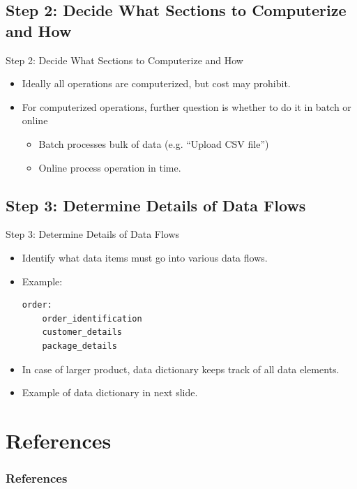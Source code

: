 \documentclass{beamer}
\begin{document}
	\subsection{Step 2: Decide What Sections to Computerize and How}
	\begin{frame}{Step 2: Decide What Sections to Computerize and How}
		\begin{itemize}
			\item Ideally all operations are computerized, but cost may prohibit.
			\item For computerized operations, further question is whether to do it in batch or online
			\begin{itemize}
				\item Batch processes bulk of data (e.g. ``Upload CSV file'')
				\item Online process operation in time.
			\end{itemize}
		\end{itemize}
	\end{frame}

	\subsection{Step 3: Determine Details of Data Flows}
	\begin{frame}[fragile]{Step 3: Determine Details of Data Flows}
		\begin{itemize}
			\item Identify what data items must go into various data flows.
			\item Example:
\begin{verbatim}
order:
    order_identification
    customer_details
    package_details
\end{verbatim}
			\item In case of larger product, data dictionary keeps track of all data elements.
			\item Example of data dictionary in next slide.
		\end{itemize}
	\end{frame}
	
	\section{References}
	\begin{frame}[allowframebreaks]
	        \frametitle{References}
	        
	        
	\end{frame}
\end{document}
